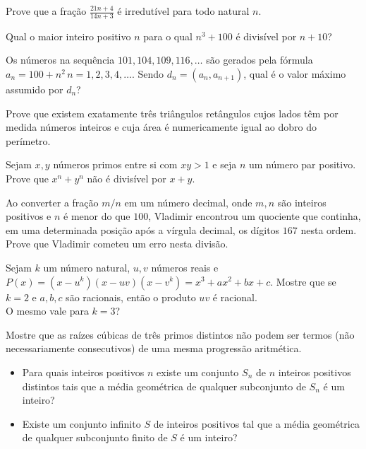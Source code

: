\begin{questao}
  Prove que a fração $\displaystyle \frac{21n+4}{14n+3}$ é
  irredutível para todo natural $n$.
\end{questao}

\begin{questao}
  Qual o maior inteiro positivo $n$ para o qual $n^3+100$
  é divisível por $n+10$?
\end{questao}

\begin{questao}
  Os números na sequência $101, 104, 109, 116, \ldots$ são
  gerados pela fórmula $a_n=100+n^2\, n=1,2,3,4,\ldots$. Sendo
  $d_n=(a_n,a_{n+1})$, qual é o valor máximo assumido por $d_n$?
\end{questao}

\begin{questao}
  Prove que existem exatamente três triângulos retângulos
  cujos lados têm por medida números inteiros e cuja área é
  numericamente igual ao dobro do perímetro.
\end{questao}

\begin{questao}
  Sejam $x,y$ números primos entre si com $xy>1$ e seja
  $n$ um número par positivo. Prove que $x^n+y^n$ não é divisível
  por $x+y$.
\end{questao}

\begin{questao}
  Ao converter a fração $m/n$ em um número decimal, onde
  $m,n$ são inteiros positivos e $n$ é menor do que $100$,
  Vladimir encontrou um quociente que continha, em uma determinada
  posição após a vírgula decimal, os dígitos $167$ nesta ordem. Prove
  que Vladimir cometeu um erro nesta divisão.
\end{questao}

\begin{questao} 
  Sejam $k$ um número natural, $u,v$ números reais e $P(x) =
  (x-u^k)(x-uv)(x-v^k) = x^3+ax^2+bx+c$. Mostre que se $k=2$ e
  $a,b,c$ são racionais, então o produto $uv$ é racional.\\ 
  O mesmo vale para $k=3$?
\end{questao}

\begin{questao} 
  Mostre que as raízes cúbicas de três primos distintos não podem
  ser termos (não necessariamente consecutivos) de uma mesma progressão
  aritmética.
\end{questao}

\begin{questao}
  \begin{itemize}
    \item Para quais inteiros positivos $n$ existe um conjunto $S_n$ de $n$ inteiros
    positivos distintos tais que a média geométrica de qualquer subconjunto de
    $S_n$ é um inteiro?

    \item Existe um conjunto infinito $S$ de inteiros positivos tal que a média
    geométrica de qualquer subconjunto finito de $S$ é um inteiro?
  \end{itemize}
\end{questao}

